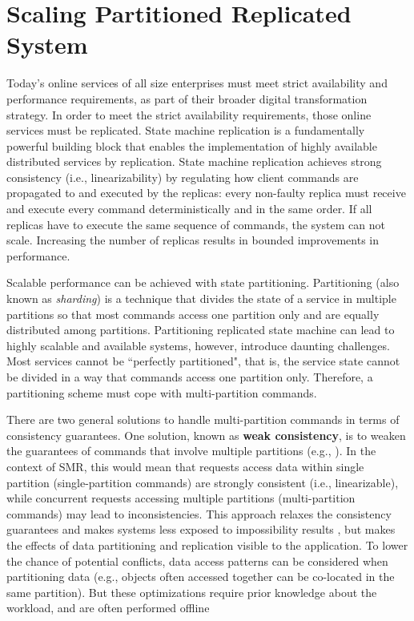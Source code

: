\chapter[Scaling Partitioned Replicated System]{Scaling Partitioned Replicated System}

Today's online services of all size enterprises must meet strict availability
and performance requirements, as part of their broader digital transformation
strategy. In order to meet the strict availability requirements, those online
services must be replicated. State machine replication is a fundamentally
powerful building block that enables the implementation of highly available
distributed services by replication. State machine replication achieves strong
consistency (i.e., linearizability) by regulating how client commands are
propagated to and executed by the replicas: every non-faulty replica must
receive and execute every command deterministically and in the same order. If
all replicas have to execute the same sequence of commands, the system can not
scale. Increasing the number of replicas results in bounded improvements in
performance.

Scalable performance can be achieved with state partitioning. Partitioning (also
known as \emph{sharding}) is a technique that divides the state of a service in
multiple partitions so that most commands access one partition only and are
equally distributed among partitions. Partitioning replicated state machine can
lead to highly scalable and available systems, however, introduce daunting
challenges. Most services cannot be ``perfectly partitioned", that is, the
service state cannot be divided in a way that commands access one partition
only. Therefore, a partitioning scheme must cope with multi-partition commands.

There are two general solutions to handle multi-partition commands in terms of
consistency guarantees. One solution, known as \textbf{weak consistency}, is to
weaken the guarantees of commands that involve multiple partitions (e.g.,
\cite{facebookTAO}). In the context of SMR, this would mean that requests access
data within single partition (single-partition commands) are strongly consistent
(i.e., linearizable), while concurrent requests accessing multiple partitions
(multi-partition commands) may lead to inconsistencies. This approach relaxes
the consistency guarantees and makes systems less exposed to impossibility
results \cite{FLP85, diskpaxos}, but makes the effects of data partitioning and
replication visible to the application. To lower the chance of potential
conflicts, data access patterns can be considered when partitioning data (e.g.,
objects often accessed together can be co-located in the same partition). But
these optimizations require prior knowledge about the workload, and are often
performed offline \cite{facebookTAO}

